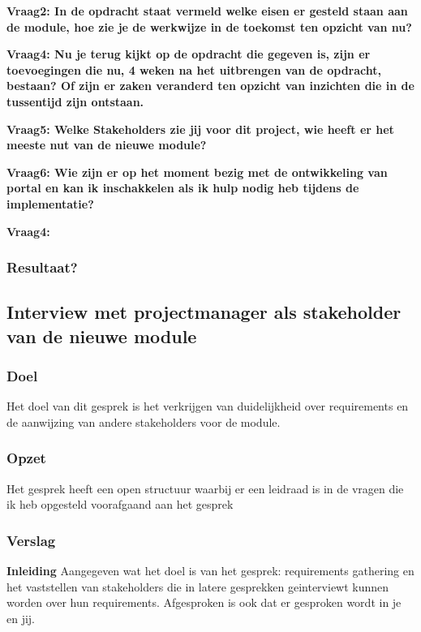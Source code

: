 \lipsum[01]
\bigskip

\textbf{Vraag2: In de opdracht staat vermeld welke eisen er gesteld staan aan de module, hoe zie je de werkwijze in de toekomst ten opzicht van nu?}

\lipsum[03]
\bigskip

\textbf{Vraag4: Nu je terug kijkt op de opdracht die gegeven is, zijn er toevoegingen die nu, 4 weken na het uitbrengen van de opdracht, bestaan? Of zijn er zaken veranderd ten opzicht van inzichten die in de tussentijd zijn ontstaan.}

\lipsum[05]
\bigskip

\textbf{Vraag5: Welke Stakeholders zie jij voor dit project, wie heeft er het meeste nut van de nieuwe module? }

\lipsum[06]
\bigskip

\textbf{Vraag6: Wie zijn er op het moment bezig met de ontwikkeling van portal en kan ik inschakkelen als ik hulp nodig heb tijdens de implementatie?}

\lipsum[09]
\bigskip

\textbf{Vraag4: }

\lipsum[07]

\subsubsection{Resultaat?}

\subsection{Interview met projectmanager als stakeholder van de nieuwe module}

\subsubsection{Doel}
Het doel van dit gesprek is het verkrijgen van duidelijkheid over requirements en de aanwijzing van andere stakeholders voor de module.

\subsubsection{Opzet}
Het gesprek heeft een open structuur waarbij er een leidraad is in de vragen die ik heb opgesteld voorafgaand aan het gesprek

\subsubsection{Verslag}
\textbf{Inleiding}
Aangegeven wat het doel is van het gesprek: requirements gathering en het vaststellen van stakeholders die in latere gesprekken geinterviewt kunnen worden over hun requirements. Afgesproken is ook dat er gesproken wordt in je en jij.

